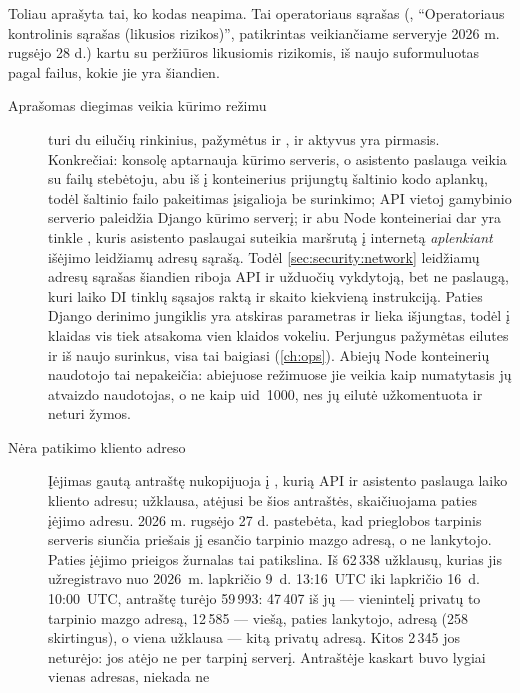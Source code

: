 Toliau aprašyta tai, ko kodas neapima. Tai operatoriaus sąrašas
(, \enquote{Operatoriaus kontrolinis sąrašas (likusios rizikos)},
patikrintas veikiančiame serveryje 2026 m. rugsėjo 28 d.) kartu su peržiūros likusiomis
rizikomis, iš naujo suformuluotas pagal failus, kokie jie yra šiandien.

\begin{description}
  \item[Aprašomas diegimas veikia kūrimo režimu]
     turi du eilučių rinkinius, pažymėtus  ir ,
    ir aktyvus yra pirmasis. Konkrečiai: konsolę aptarnauja kūrimo serveris, o asistento
    paslauga veikia su failų stebėtoju, abu iš į konteinerius prijungtų šaltinio kodo
    aplankų, todėl šaltinio failo pakeitimas įsigalioja be surinkimo; API vietoj gamybinio
    serverio paleidžia Django kūrimo serverį; ir abu Node konteineriai dar yra tinkle
    , kuris
    asistento paslaugai suteikia maršrutą į internetą \emph{aplenkiant} išėjimo leidžiamų
    adresų sąrašą. Todėl \cref{sec:security:network} leidžiamų adresų sąrašas šiandien riboja
    API ir užduočių vykdytoją, bet ne paslaugą, kuri laiko DI tinklų sąsajos raktą ir skaito
    kiekvieną instrukciją. Paties Django derinimo jungiklis yra atskiras parametras ir lieka
    išjungtas, todėl į klaidas vis tiek atsakoma vien klaidos vokeliu. Perjungus pažymėtas eilutes
    ir iš naujo surinkus, visa tai baigiasi (\cref{ch:ops}). Abiejų Node konteinerių naudotojo
    tai nepakeičia: abiejuose režimuose jie veikia kaip numatytasis jų atvaizdo naudotojas, o ne
    kaip uid~1000, nes jų eilutė  užkomentuota ir neturi žymos.
  \item[Nėra patikimo kliento adreso] Įėjimas gautą  antraštę
    nukopijuoja į , kurią API ir asistento paslauga laiko kliento adresu;
    užklausa, atėjusi be šios antraštės, skaičiuojama paties įėjimo adresu.
    2026 m. rugsėjo 27 d. pastebėta, kad prieglobos tarpinis serveris siunčia priešais jį
    esančio tarpinio mazgo adresą, o ne lankytojo. Paties įėjimo prieigos žurnalas tai
    patikslina. Iš 62\,338 užklausų, kurias jis užregistravo nuo 2026~m. lapkričio 9~d.
    13:16~UTC iki lapkričio 16~d. 10:00~UTC, antraštę turėjo 59\,993: 47\,407 iš jų ---
    vienintelį privatų to tarpinio mazgo adresą, 12\,585 --- viešą, paties lankytojo, adresą
    (258 skirtingus), o viena užklausa --- kitą privatų adresą. Kitos 2\,345 jos neturėjo: jos
    atėjo ne per tarpinį serverį. Antraštėje kaskart buvo lygiai vienas adresas, niekada ne

\end{description}
